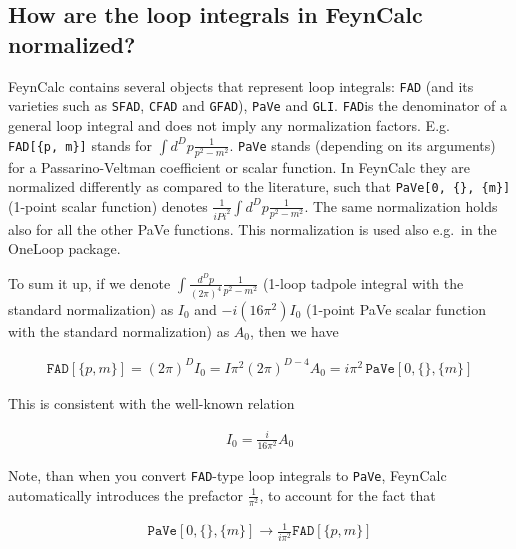 \documentclass[../FeynCalcManual.tex]{subfiles}
\begin{document}
\hypertarget{how-are-the-loop-integrals-in-feyncalc-normalized}{%
\subsection{How are the loop integrals in FeynCalc
normalized?}\label{how-are-the-loop-integrals-in-feyncalc-normalized}}

FeynCalc contains several objects that represent loop integrals:
\texttt{FAD} (and its varieties such as \texttt{SFAD}, \texttt{CFAD} and
\texttt{GFAD}), \texttt{PaVe} and \texttt{GLI}. \texttt{FAD}is the
denominator of a general loop integral and does not imply any
normalization factors. E.g.
\texttt{FAD[\allowbreak{}\{\allowbreak{}p,\ \allowbreak{}m\}]} stands
for \(\int d^D p \frac{1}{p^2-m^2}\). \texttt{PaVe} stands (depending on
its arguments) for a Passarino-Veltman coefficient or scalar function.
In FeynCalc they are normalized differently as compared to the
literature, such that
\texttt{PaVe[\allowbreak{}0,\ \allowbreak{}\{\allowbreak{}\},\ \allowbreak{}\{\allowbreak{}m\}]}
(1-point scalar function) denotes
\(\frac{1}{i Pi^2} \int d^D p \frac{1}{p^2-m^2}\). The same
normalization holds also for all the other PaVe functions. This
normalization is used also e.g.~in the OneLoop package.

To sum it up, if we denote
\(\int \frac{d^D p}{(2 \pi)^4} \frac{1}{p^2-m^2}\) (1-loop tadpole
integral with the standard normalization) as \(I_0\) and
\(-i (16 \pi^2) I_0\) (1-point PaVe scalar function with the standard
normalization) as \(A_0\), then we have

\begin{align*}
\mathtt{FAD}[\{p,m\}] = (2\pi)^D I_0 = I \pi^2 (2 \pi)^{D-4} A_0 = i \pi^2 \, \mathtt{PaVe}[0, \{\}, \{m\}]
\end{align*}

This is consistent with the well-known relation

\begin{align*}
I_0 = \frac{i}{16 \pi^2} A_0
\end{align*}

Note, than when you convert \texttt{FAD}-type loop integrals to
\texttt{PaVe}, FeynCalc automatically introduces the prefactor
\(\frac{1}{\pi^2}\), to account for the fact that

\begin{align*}
\mathtt{PaVe}[0, \{\}, \{m\}] \to \frac{1}{i \pi^2} \mathtt{FAD}[\{p,m\}]
\end{align*}
\end{document}
